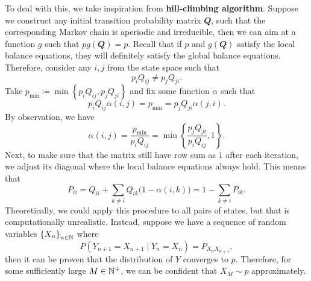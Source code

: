 \documentclass[math, code]{amznotes}
\theoremstyle{remark}
\begin{document}
To deal with this, we take inspiration from \textbf{hill-climbing algorithm}. Suppose we construct any initial transition probability matrix $\mathbfit{Q}$, such that the corresponding Markov chain is aperiodic and irreducible, then we can aim at a function $g$ such that $pg\left(\mathbfit{Q}\right) = p$. Recall that if $p$ and $g\left(\mathbfit{Q}\right)$ satisfy the local balance equations, they will definitely satisfy the global balance equations. Therefore, consider any $i, j$ from the state space such that
\begin{equation*}
    p_iQ_{ij} \neq p_jQ_{ji}.    
\end{equation*}
Take $p_{\min} \coloneqq \min\left\{p_iQ_{ij}, p_jQ_{ji}\right\}$ and fix some function $\alpha$ such that
\begin{equation*}
    p_iQ_{ij}\alpha\left(i, j\right) = p_{\min} = p_jQ_{ji}\alpha\left(j, i\right).    
\end{equation*}
By observation, we have 
\begin{equation*}
    \alpha\left(i, j\right) = \frac{p_{\min}}{p_iQ_{ij}} = \min\left\{\frac{p_jQ_{ji}}{p_iQ_{ij}}, 1\right\}.
\end{equation*}
Next, to make sure that the matrix still have row sum as $1$ after each iteration, we adjust its diagonal where the local balance equations always hold. This means that 
\begin{equation*}
    P_{ii} = Q_{ii} + \sum_{k \neq i}Q_{ik}\bigl(1 - \alpha\left(i, k\right)\bigr) = 1 - \sum_{k \neq i}P_{ik}.
\end{equation*}
Theoretically, we could apply this procedure to all pairs of states, but that is computationally unrealistic. Instead, suppose we have a sequence of random variables $\left\{X_n\right\}_{n \in \mathbb{N}}$ where 
\begin{equation*}
    P\left(Y_{n + 1} = X_{n + 1} \mid Y_n = X_n\right) = P_{X_nX_{n + 1}},
\end{equation*}
then it can be proven that the distribution of $Y$ converges to $p$. Therefore, for some sufficiently large $M \in \mathbb{N}^+$, we can be confident that $X_M \sim p$ approximately. 
\end{document}
